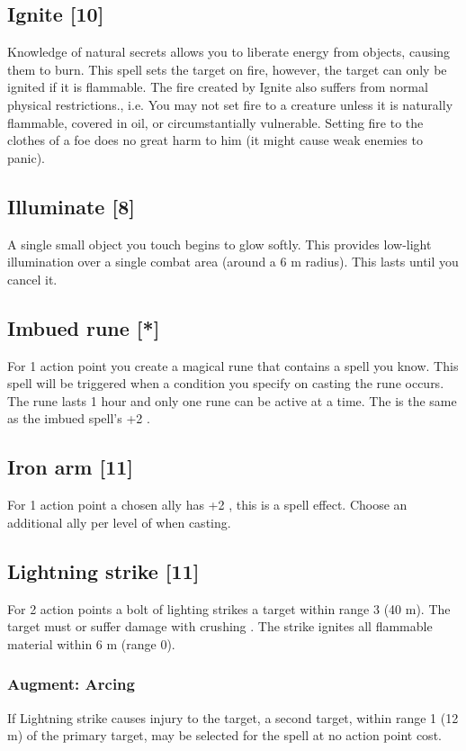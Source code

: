 \subsection{Ignite [10]}
\label{spell:ignite}
Knowledge of natural secrets allows you to liberate energy from objects, causing them to burn. This spell sets the target on fire, however, the target can only be ignited if it is flammable. The fire created by Ignite also suffers from normal physical restrictions., i.e. You may not set fire to a creature unless it is naturally flammable, covered in oil, or circumstantially vulnerable. Setting fire to the clothes of a foe does no great harm to him (it might cause weak enemies to panic).

\subsection{Illuminate [8]}
\label{spell:illuminate}
A single small object you touch begins to glow softly. This provides low-light illumination over a single combat area (around a 6 m radius). This lasts until you cancel it.

\subsection{Imbued rune [*]}
For 1 action point you create a magical rune that contains a spell you know. This spell will be triggered when a condition you specify on casting the rune occurs. The rune lasts 1 hour and only one rune can be active at a time. The  is the same as the imbued spell's +2 .

\subsection{Iron arm [11]}
For 1 action point a chosen ally has +2 , this is a  spell effect. Choose an additional ally per level of  when casting.

\subsection{Lightning strike [11]}
For 2 action points a bolt of lighting strikes a target within range 3 (40 m). The target must  or suffer damage with crushing . The strike ignites all flammable material within 6 m (range 0).
\subsubsection{Augment: Arcing}
If Lightning strike causes injury to the target, a second target, within range 1 (12 m) of the primary target, may be selected for the spell at no action point cost. 


